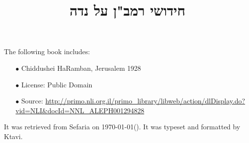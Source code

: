 \documentclass[12pt, openany]{book}
\newcommand{\texttitle}{חידושי רמב"ן על נדה}\usepackage{titlesec}
\begin{document}
\frontmatter
{}

\title{\texttitle}

\author{}

\date{}

\maketitle

\begin{minipage}[b][\textheight][b]{\textwidth}\englishfont	
	\begin{english}
		\vfill
		The following book includes:
\begin{itemize}
\item[$\bullet$] Chiddushei HaRamban, Jerusalem 1928
\item[$\bullet$] License: Public Domain
\item[$\bullet$] Source: \url{http://primo.nli.org.il/primo_library/libweb/action/dlDisplay.do?vid=NLI&docId=NNL_ALEPH001294828}
\end{itemize}
		It was retrieved from Sefaria on \today\space \texthebrew{(\Hebrewtoday)}.  It was typeset and formatted by Ktavi.
		\clearpage
		
	\end{english}
\end{minipage}


\tableofcontents

\clearpage
\mainmatter
{}
\end{document}
